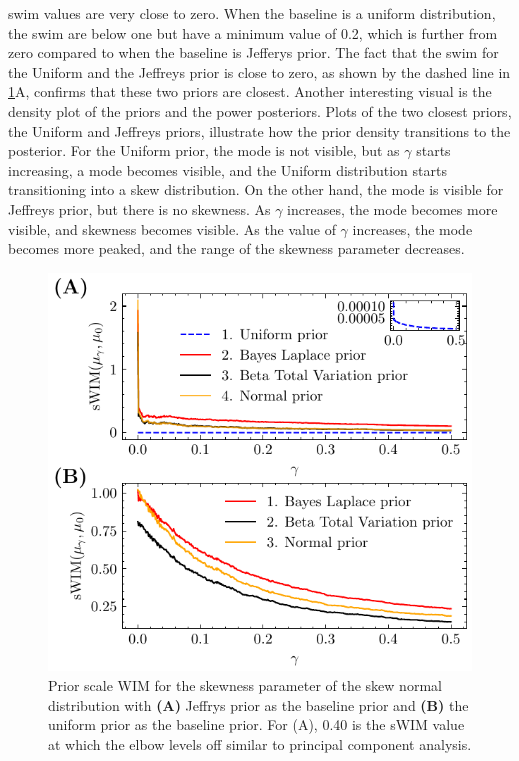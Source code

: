 \documentclass[12pt]{article}
\begin{document}
\gls{swim} values are very close to zero. When the baseline is a uniform
distribution, the \gls{swim} are below one but have a minimum value of 0.2,
which is further from zero compared to when the baseline is Jefferys prior. The
fact that the \gls{swim} for the Uniform and the Jeffreys prior is close to
zero, as shown by the dashed line in \cref{fig:swimdistskew}A, confirms that
these two priors are closest. Another interesting visual is the density plot of
the priors and the power posteriors. Plots of the two closest priors, the
Uniform and Jeffreys priors, illustrate how the prior density transitions to
the posterior. For the Uniform prior, the mode is not visible, but as $\gamma$
starts increasing, a mode becomes visible, and the Uniform distribution starts
transitioning into a skew distribution. On the other hand, the mode is visible
for Jeffreys prior, but there is no skewness. As $\gamma$ increases, the mode
becomes more visible, and skewness becomes visible. As the value of $\gamma$
increases, the mode becomes more peaked, and the range of the skewness
parameter decreases.


\begin{figure}
\begin{center}
\includegraphics{imgs/swim_distskew.pdf}
\end{center}
\caption{Prior scale WIM for the skewness parameter of the skew normal distribution with \textbf{(A)} Jeffrys prior as the baseline prior and \textbf{(B)} the uniform prior as the baseline prior. For (A), 0.40 is the sWIM value at which the elbow levels off similar to principal component analysis.}\label{fig:swimdistskew}
\end{figure}
\end{document}

